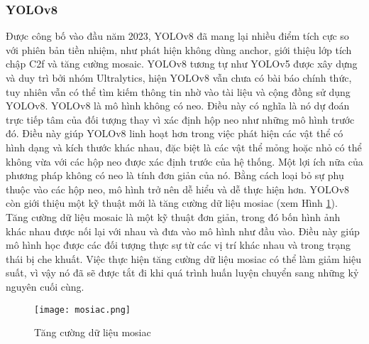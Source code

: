 \documentclass[../the.tex]{subfiles}
\begin{document}
\subsubsection{YOLOv8}
\label{sec:yolov8}
{\fontsize{13}{12} \selectfont

	Được công bố vào đầu năm 2023, YOLOv8 \cite{YOLOv8} đã mang lại nhiều điểm tích cực so với phiên bản tiền nhiệm, như phát hiện không dùng anchor, giới thiệu lớp tích chập C2f và tăng cường mosaic.
	YOLOv8 tương tự như YOLOv5 được xây dựng và duy trì bởi nhóm Ultralytics, hiện YOLOv8 vẫn chưa có bài báo chính thức, tuy nhiên vẫn có thể tìm kiếm thông tin nhờ vào tài liệu và cộng đồng sử dụng YOLOv8.
	YOLOv8 là mô hình không có neo. Điều này có nghĩa là nó dự đoán trực tiếp tâm của đối tượng thay vì xác định hộp neo như những mô hình trước đó.
	Điều này giúp YOLOv8 linh hoạt hơn trong việc phát hiện các vật thể có hình dạng và kích thước khác nhau, đặc biệt là các vật thể mỏng hoặc nhỏ có thể không vừa với các hộp neo được xác định trước của hệ thống.
	Một lợi ích nữa của phương pháp không có neo là tính đơn giản của nó. Bằng cách loại bỏ sự phụ thuộc vào các hộp neo, mô hình trở nên dễ hiểu và dễ thực hiện hơn.
	YOLOv8 còn giới thiệu một kỹ thuật mới là tăng cường dữ liệu mosiac (xem Hình \ref{fig:mosaic}). Tăng cường dữ liệu mosaic là một kỹ thuật đơn giản, trong đó bốn hình ảnh khác nhau được nối lại với nhau và đưa vào mô hình như đầu vào. Điều này giúp mô hình học được các đối tượng thực sự từ các vị trí khác nhau và trong trạng thái bị che khuất.
	Việc thực hiện tăng cường dữ liệu mosiac có thể làm giảm hiệu suất, vì vậy nó đã sẽ được tắt đi khi quá trình huấn luyện chuyển sang những kỷ nguyên cuối cùng.

}

\begin{figure}[H]
	\centering
	\texttt{[image: mosiac.png]}
	\caption[]{Tăng cường dữ liệu mosiac\footnotemark}
	\label{fig:mosaic}
\end{figure}

\end{document}
